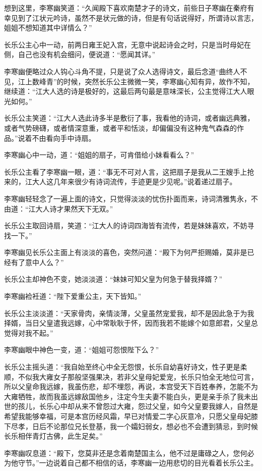 想到这里，李寒幽笑道：“久闻殿下喜欢南楚才子的诗文，前些日子寒幽在秦府有幸见到了江状元吟诗，虽然不是状元做的诗，但是有句话说得好，所谓诗以言志，姐姐不想知道其中详情么？”

长乐公主心中一动，前两日雍王妃入宫，无意中说起诗会之时，只是当时母妃在侧，自己也没有机会细问，便说道：“愿闻其详。”

李寒幽便略过众人钩心斗角不提，只是说了众人选得诗文，最后念道“曲终人不见，江上数峰青”的时候，突然长乐公主微微一笑，李寒幽心知有异，故作不知，继续道：“江大人选的诗是极好的，这最后两句最是意味深长，公主觉得江大人眼光如何。”

长乐公主笑道：“江大人选此诗多半是敷衍了事，我看他的诗词，或者幽远典雅，或者气势磅礴，或者情深意重，或者平和恬淡，却偏偏没有这种鬼气森森的作品。”说着不由看向手中诗扇。

李寒幽心中一动，道：“姐姐的扇子，可肯借给小妹看看么？”

长乐公主看了李寒幽一眼，道：“事无不可对人言，这把扇子是我从二王嫂手上抢来的，江大人这几年来很少有诗词流传，手迹更是少见呢。”说着递过扇子。

李寒幽轻轻念了一遍上面的诗文，只觉得淡淡的忧伤扑面而来，诗词清雅隽永，不由道：“江大人诗才果然天下无双。”

长乐公主取回诗扇，笑道：“江大人的诗词四海皆有流传，若是妹妹喜欢，不妨寻找一下。”

李寒幽见长乐公主面上有淡淡的喜色，突然问道：“殿下为何严拒赐婚，莫非是已经有了意中人么？”

长乐公主却神色不变，她淡淡道：“妹妹可知父皇为何急于替我择婿？”

李寒幽裣衽道：“陛下爱重公主，天下皆知。”

长乐公主淡淡道：“天家骨肉，亲情淡薄，父皇虽然宠爱我，却不是因此急于为我择婿，当日父皇遣我远嫁，心中常耿耿于怀，因而我若不能嫁个如意郎君，父皇总觉得对我不起。”

李寒幽眼中神色一变，道：“姐姐可怨恨陛下么？”

长乐公主摇头道：“我自始至终心中全无怨恨，长乐自幼喜好诗文，性子更是柔顺，不似我大雍女子那般坚强果决，若非父皇母妃爱宠，长乐只怕全无地位可言，所以父皇命我远嫁，我虽伤悲，却不埋怨，再说，本宫受天下百姓奉养，怎能不为大雍牺牲，故而我虽远嫁敌国他乡，注定今生夫妻不能白头，更是亲手杀了我未出世的孩儿，长乐心中却从来不曾怨过大雍，怨过父皇，如今父皇要我嫁人，自然是希望我能够幸福，可是本宫历经风霜，早已对情爱二字心灰意冷，只愿父皇母妃膝下尽孝，日后不论那位兄长登基，我一个孀妇弱女，想必也不会遭到猜忌，到时候长乐相伴青灯古佛，此生足矣。”

李寒幽叹息道：“殿下，您莫非还是念着南楚国主么，他不过是庸碌之人，您何必为他守节。”一边说着自己都不相信的话，李寒幽一边用悲切的目光看着长乐公主。

